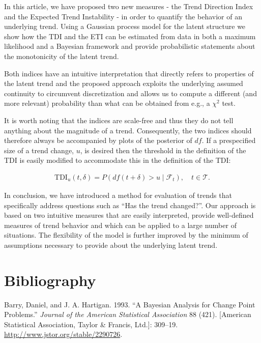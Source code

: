 \documentclass[11pt,]{article}
\theoremstyle{nonumberplain}
\begin{document}
In this article, we have proposed two new measures - the Trend Direction
Index and the Expected Trend Instability - in order to quantify the
behavior of an underlying trend. Using a Gaussian process model for the
latent structure we show how the TDI and the ETI can be estimated from
data in both a maximum likelihood and a Bayesian framework and provide
probabilistic statements about the monotonicity of the latent trend.

Both indices have an intuitive interpretation that directly refers to
properties of the latent trend and the proposed approach exploits the
underlying assumed continuity to circumvent discretization and allows us
to compute a different (and more relevant) probability than what can be
obtained from e.g., a \(\chi^2\) test.

It is worth noting that the indices are scale-free and thus they do not
tell anything about the magnitude of a trend. Consequently, the two
indices should therefore always be accompanied by plots of the posterior
of \(df\). If a prespecified size of a trend change, \(u\), is desired
then the threshold in the definition of the TDI is easily modified to
accommodate this in the definition of the TDI:

\begin{align*}
  \mathrm{TDI}_u(t, \delta) = P(df(t + \delta) > u \mid \mathcal{F}_t), \quad t \in \mathcal{T}.
\end{align*}

In conclusion, we have introduced a method for evaluation of trends that
specifically address questions such as ``Has the trend changed?''. Our
approach is based on two intuitive measures that are easily interpreted,
provide well-defined measures of trend behavior and which can be applied
to a large number of situations. The flexibility of the model is further
improved by the minimum of assumptions necessary to provide about the
underlying latent trend.

\section{Bibliography}\label{bibliography}

\hypertarget{refs}{}
\hypertarget{ref-barry1993bayesianchangepoint}{}
Barry, Daniel, and J. A. Hartigan. 1993. ``A Bayesian Analysis for
Change Point Problems.'' \emph{Journal of the American Statistical
Association} 88 (421). {[}American Statistical Association, Taylor \&
Francis, Ltd.{]}: 309--19. \url{http://www.jstor.org/stable/2290726}.
\end{document}
